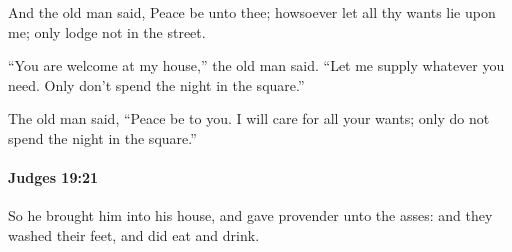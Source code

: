 			\begin{versebox}
					\item[BHS] 
					\item[ASV] And the old man said, Peace be unto thee; howsoever let all thy wants lie upon me; only lodge not in the street.
					\item[NIV] “You are welcome at my house,” the old man said. “Let me supply whatever you need. Only don’t spend the night in the square.”
					\item[NRSV] The old man said, “Peace be to you. I will care for all your wants; only do not spend the night in the square.”
			\end{versebox}

		\paragraph{Judges 19:21} %
			\label{JUDGES-19-21}

			So he brought him into his house, and gave provender unto the asses: and they washed their feet, and did eat and drink.

